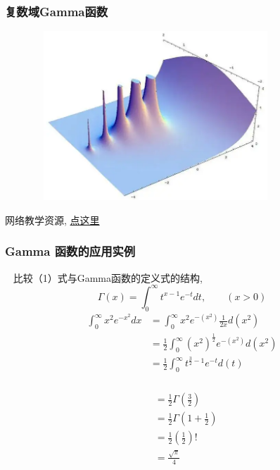 \begin{frame}
	\frametitle{复数域Gamma函数}
  \begin{center}
	   \includegraphics[width=0.85\textwidth,height=2.5in]{figs/2022-03-26-17-20-10.png}
  \end{center}
  网络教学资源, \href{https://www.bilibili.com/video/av892512155/}{点这里}
\end{frame}

\begin{frame}
	\frametitle{Gamma 函数的应用实例}
	\解 ~ 比较（1）式与Gamma函数的定义式的结构,
	\[\Gamma(x)=\int_{0}^{\infty} t^{x-1} e^{-t} dt, \qquad (x>0)\]
	\[\begin{aligned}
		\int_{0}^{\infty} x^2 e^{-x^2} dx &= \int_{0}^{\infty} x^2 e^{-(x^2)} \frac{1}{2x}d(x^2)\\
		&= \frac{1}{2}\int_{0}^{\infty} (x^2)^{\frac{1}{2}} e^{-(x^2)} d(x^2)\\	
		&= \frac{1}{2}\int_{0}^{\infty} t^{\frac{3}{2}-1} e^{-t} d(t)
	\end{aligned} \]
\end{frame}

\begin{frame}
	  \frametitle{}
	  \[\begin{aligned}	
		&= \frac{1}{2}\Gamma(\frac{3}{2})  \\ 
		&= \frac{1}{2} \Gamma(1+\frac{1}{2}) \\
		&= \frac{1}{2} (\frac{1}{2})!	\\
		&= \frac{\sqrt{\pi}}{4}
	\end{aligned} \]
\end{frame}

